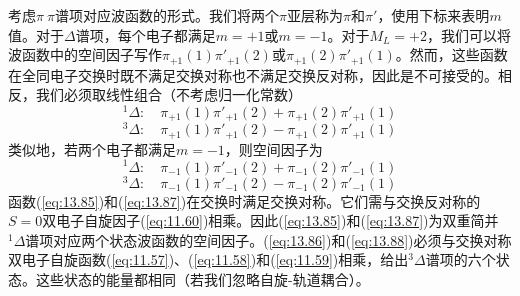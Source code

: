     考虑$\pi\:\pi$谱项对应波函数的形式。我们将两个$\pi$亚层称为$\pi$和$\pi'$，使用下标来表明$m$值。对于$\Delta$谱项，每个电子都满足$m=+1$或$m=-1$。对于$M_L = +2$，我们可以将波函数中的空间因子写作$\pi_{+1}\left(1\right)\pi'_{+1}\left(2\right)$或$\pi_{+1}\left(2\right)\pi'_{+1}\left(1\right)$。然而，这些函数在全同电子交换时既不满足交换对称也不满足交换反对称，因此是不可接受的。相反，我们必须取线性组合（不考虑归一化常数）
    \begin{equation}
        ^1\Delta: \quad \pi_{+1}\left(1\right)\pi'_{+1}\left(2\right) + \pi_{+1}\left(2\right)\pi'_{+1}\left(1\right)
        \label{eq:13.85}
    \end{equation}
    \begin{equation}
        ^3\Delta: \quad \pi_{+1}\left(1\right)\pi'_{+1}\left(2\right) - \pi_{+1}\left(2\right)\pi'_{+1}\left(1\right)
        \label{eq:13.86}
    \end{equation}
    类似地，若两个电子都满足$m=-1$，则空间因子为
    \begin{equation}
        ^1\Delta: \quad \pi_{-1}\left(1\right)\pi'_{-1}\left(2\right) + \pi_{-1}\left(2\right)\pi'_{-1}\left(1\right)
        \label{eq:13.87}
    \end{equation}
    \begin{equation}
        ^3\Delta: \quad \pi_{-1}\left(1\right)\pi'_{-1}\left(2\right) - \pi_{-1}\left(2\right)\pi'_{-1}\left(1\right)
        \label{eq:13.88}
    \end{equation}
    函数(\ref{eq:13.85})和(\ref{eq:13.87})在交换时满足交换对称。它们需与交换反对称的$S=0$双电子自旋因子(\ref{eq:11.60})相乘。因此(\ref{eq:13.85})和(\ref{eq:13.87})为双重简并$^1\Delta$谱项对应两个状态波函数的空间因子。(\ref{eq:13.86})和(\ref{eq:13.88})必须与交换对称双电子自旋函数(\ref{eq:11.57})、(\ref{eq:11.58})和(\ref{eq:11.59})相乘，给出$^3\Delta$谱项的六个状态。这些状态的能量都相同（若我们忽略自旋-轨道耦合）。

